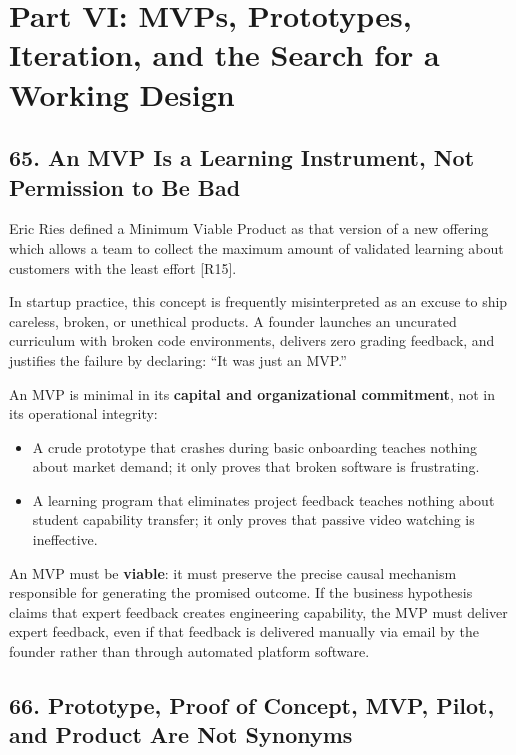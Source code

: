 \section*{Part VI: MVPs, Prototypes, Iteration, and the Search for a Working Design}

\subsection*{65. An MVP Is a Learning Instrument, Not Permission to Be Bad}

Eric Ries defined a Minimum Viable Product as that version of a new offering which allows a team to collect the maximum amount of validated learning about customers with the least effort [R15].

In startup practice, this concept is frequently misinterpreted as an excuse to ship careless, broken, or unethical products. A founder launches an uncurated curriculum with broken code environments, delivers zero grading feedback, and justifies the failure by declaring: ``It was just an MVP.''

An MVP is minimal in its \textbf{capital and organizational commitment}, not in its operational integrity:
\begin{itemize}
    \item A crude prototype that crashes during basic onboarding teaches nothing about market demand; it only proves that broken software is frustrating.
    \item A learning program that eliminates project feedback teaches nothing about student capability transfer; it only proves that passive video watching is ineffective.
\end{itemize}

An MVP must be \textbf{viable}: it must preserve the precise causal mechanism responsible for generating the promised outcome. If the business hypothesis claims that expert feedback creates engineering capability, the MVP must deliver expert feedback, even if that feedback is delivered manually via email by the founder rather than through automated platform software.

\subsection*{66. Prototype, Proof of Concept, MVP, Pilot, and Product Are Not Synonyms}

